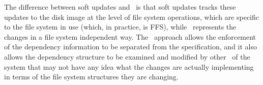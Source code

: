The difference between soft updates and \Kudos\ is that soft updates tracks
these updates to the disk image at the level of file system operations, which
are specific to the file system in use (which, in practice, is FFS), while
\Kudos\ represents the changes in a file system independent way. The \Kudos\
approach allows the enforcement of the dependency information to be separated
from the specification, and it also allows the dependency structure to be
examined and modified by other \modules\ of the system that may not have any
idea what the changes are actually implementing in terms of the file system
structures they are changing.
